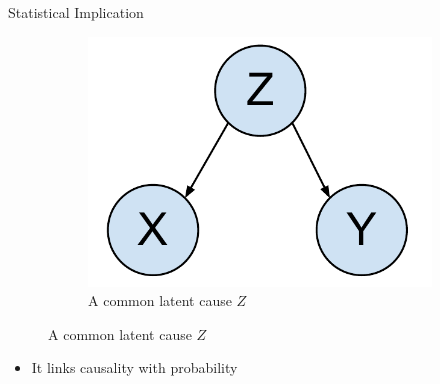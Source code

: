 \begin{frame}{Statistical Implication}
\begin{figure}
\begin{subfigure}[H]{0.3\textwidth}
	\end{subfigure}
	\begin{subfigure}[H]{0.3\textwidth}
		\centering
		\includegraphics[scale=0.3]{imgs/z2xy}
		\caption{A common latent cause $Z$}
	\end{subfigure}
\end{figure}\pause
\begin{itemize}
\item<+-|alert@+> It links causality with probability
\end{itemize}
\end{frame}
